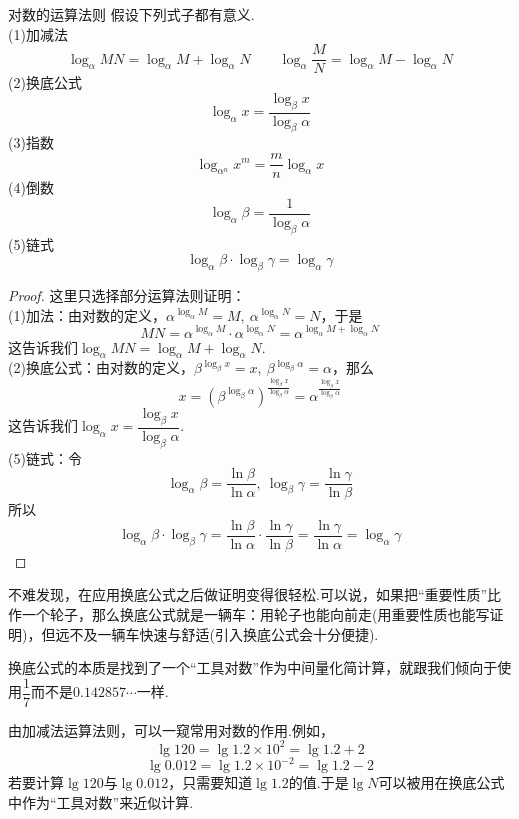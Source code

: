 \documentclass[lang=cn, zihao=4.5]{elegantbook}
\begin{document}
\begin{proposition}{对数的运算法则}
	假设下列式子都有意义. \\
	(1)加减法$$\log_{\alpha}{MN} = \log_{\alpha}{M} + \log_{\alpha}{N} \qquad \log_{\alpha}{\frac{M}{N}} = \log_{\alpha}{M} - \log_{\alpha}{N}$$
	(2)换底公式$$\log_{\alpha}{x} = \frac{\log_{\beta}{x}}{\log_{\beta}{\alpha}}$$
	(3)指数$$\log_{\alpha ^n}{x^m} = \frac{m}{n} \log_{\alpha}{x}$$
	(4)倒数$$\log_{\alpha}{\beta} = \frac{1}{\log_{\beta}{\alpha}}$$
	(5)链式$$\log_{\alpha}{\beta} \cdot \log_{\beta}{\gamma} = \log_{\alpha}{\gamma}$$
\end{proposition}
\begin{proof}
	这里只选择部分运算法则证明： \\
	(1)加法：由对数的定义，$\alpha ^{\log_{\alpha}{M}} = M,~\alpha ^{\log_{\alpha}{N}} = N$，于是$$MN = \alpha ^{\log_{\alpha}{M}} \cdot \alpha ^{\log_{\alpha}{N}} = \alpha ^{\log_{\alpha}{M} + \log_{\alpha}{N}}$$
	这告诉我们$\log_{\alpha}{MN} = \log_{\alpha}{M} + \log_{\alpha}{N}$. \\
	(2)换底公式：由对数的定义，$\beta ^{\log_{\beta}{x}} = x,~\beta ^{\log_{\beta}{\alpha}} = \alpha$，那么$$x = (\beta ^{\log_{\beta}{\alpha}})^{\frac{\log_{\beta}{x}}{\log_{\beta}{\alpha}}} = \alpha ^{\frac{\log_{\beta}{x}}{\log_{\beta}{\alpha}}}$$
	这告诉我们$\log_{\alpha}{x} = \dfrac{\log_{\beta}{x}}{\log_{\beta}{\alpha}}$. \\
	(5)链式：令$$\log_{\alpha}{\beta} = \frac{\ln{\beta}}{\ln{\alpha}},~ \log_{\beta}{\gamma} = \frac{\ln{\gamma}}{\ln{\beta}}$$
	所以$$\log_{\alpha}{\beta} \cdot \log_{\beta}{\gamma} = \frac{\ln{\beta}}{\ln{\alpha}} \cdot \frac{\ln{\gamma}}{\ln{\beta}} = \frac{\ln{\gamma}}{\ln{\alpha}} = \log_{\alpha}{\gamma}$$
\end{proof}
\begin{remark}
	不难发现，在应用换底公式之后做证明变得很轻松.可以说，如果把“重要性质”比作一个轮子，那么换底公式就是一辆车：用轮子也能向前走(用重要性质也能写证明)，但远不及一辆车快速与舒适(引入换底公式会十分便捷).
\end{remark}
\begin{remark}
	换底公式的本质是找到了一个“工具对数”作为中间量化简计算，就跟我们倾向于使用$\dfrac{1}{7}$而不是$0.142857\cdots$一样.
\end{remark}
\begin{remark}
	由加减法运算法则，可以一窥常用对数的作用.例如，
	$$\lg{120} = \lg{1.2 \times 10^2} = \lg{1.2}+2$$
	$$\lg{0.012} = \lg{1.2 \times 10^{-2}} = \lg{1.2}-2$$
	若要计算$\lg{120}$与$\lg{0.012}$，只需要知道$\lg{1.2}$的值.于是$\lg{N}$可以被用在换底公式中作为“工具对数”来近似计算.
\end{remark}
\end{document}
